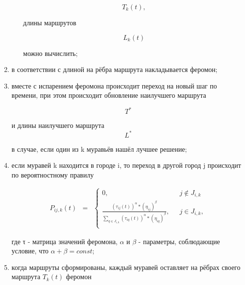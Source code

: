 \documentclass[../main.tex]{subfiles}
\begin{document}
\begin{enumerate}[1)]
\begin{enumerate}
			\begin{equation}
				\label{eq2.4}
				T_k(t),
			\end{equation}
			
			длины маршрутов
			
			\begin{equation}
				\label{eq2.5}
				L_k(t)
			\end{equation}
			
			можно вычислить;
		
		\end{enumerate}
	
		\item в соответствии с длиной на рёбра маршрута накладывается феромон;
		\item вместе с испарением феромона происходит переход на новый шаг по времени, при этом происходит обновление наилучшего маршрута
		
		\begin{equation}
			\label{eq2.6}
			T^*
		\end{equation}
		
		и длины наилучшего маршрута
		\begin{equation}
			\label{eq2.7}
			L^*
		\end{equation}
		
		в случае, если один из k муравьёв нашёл лучшее решение;
		
		\item если муравей k находится в городе i, то переход в другой город j происходит по вероятностному правилу
		
		\begin{equation}
		\label{eq2.8}
		\begin{matrix}
			P_{ij,k}(t) & = 
			& \left\{
			\begin{matrix}
				0, & \mbox{ } j \notin J_{i,k} \\
				\frac {(τ_{ij}(t))^\alpha * (η_{ij})^\beta} {\sum \limits_{q \in J_{i,k}} (τ_{iq}(t))^\alpha * (η_{iq})^\beta}, & \mbox{ } j \in J_{i,k}, \\
			\end{matrix} \right.
		\end{matrix}
		\end{equation}
		
		где τ - матрица значений феромона, $\alpha$ и $\beta$ - параметры, соблюдающие условие, что $\alpha + \beta = const$;
		
		\item когда маршруты сформированы, каждый муравей оставляет на рёбрах своего маршрута $T_k(t)$ феромон
		

\end{enumerate}
\end{document}

